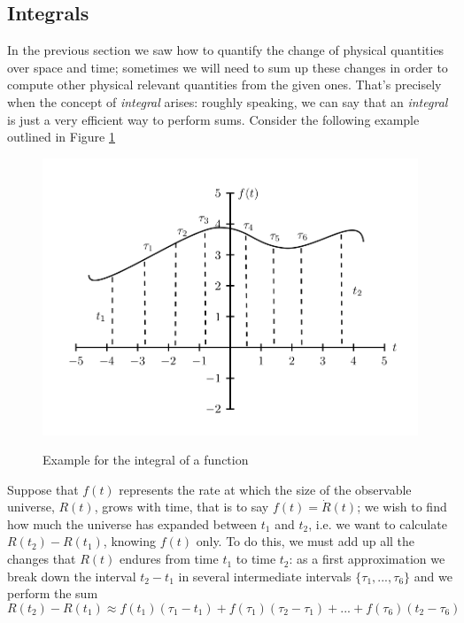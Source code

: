 \documentclass[11pt, a4paper,oneside,openright]{book}
\numberwithin{equation}{section}
\begin{document}
\subsection{Integrals}
In the previous section we saw how to quantify the change of physical quantities over space and time; sometimes we will need to sum up these changes in order to compute other physical relevant quantities from the given ones. That's precisely when the concept of \textit{integral} arises: roughly speaking, we can say that an \textit{integral} is just a very efficient way to perform sums. Consider the following example outlined in Figure \ref{function}
\begin{figure}
\begin{center}
\includegraphics[scale=0.7]{Draw/function.png}
\label{}
\end{center}
\caption{Example for the integral of a function}
\label{function}
\end{figure}
Suppose that $f(t)$ represents the rate at which the size of the observable universe, $R(t)$, grows with time, that is to say $f(t)=\dot{R}(t)$; we wish to find how much the universe has expanded between $t_1$ and $t_2$, i.e. we want to calculate $R(t_2)-R(t_1)$, knowing $f(t)$ only. To do this, we must add up all the changes that $R(t)$ endures from time $t_1$ to time $t_2$: as a first approximation we break down the interval $t_2-t_1$ in several intermediate intervals $\{\tau_1,...,\tau_6\}$ and we perform the sum
\begin{equation}
R(t_2)-R(t_1)\approx f(t_1)(\tau_1-t_1)+f(\tau_1)(\tau_2-\tau_1)+...+f(\tau_6)(t_2-\tau_6)
\end{equation} 
\end{document}
